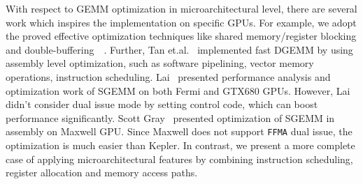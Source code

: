 With respect to GEMM optimization in microarchitectural level, there are several work which inspires the implementation 
on specific GPUs. For example, we adopt the proved effective optimization techniques like shared memory/register 
blocking and double-buffering~\cite{volkov}~\cite{tan}. Further, Tan et.al.~\cite{tan} implemented fast DGEMM by using 
assembly level optimization, such as software pipelining, vector memory operations, instruction scheduling. 
Lai~\cite{lai} presented performance analysis and optimization work of SGEMM on both Fermi and GTX680 GPUs. However, 
Lai didn't consider dual issue mode by setting control code, which can boost performance significantly. Scott 
Gray~\cite{nervana_sgemm_wiki} presented optimization of SGEMM in assembly on Maxwell GPU. Since Maxwell does not 
support {\tt FFMA} dual issue, the optimization is much easier than
Kepler. In contrast, we present a more complete case of applying microarchitectural features by combining instruction 
scheduling, register allocation and memory access paths. 
